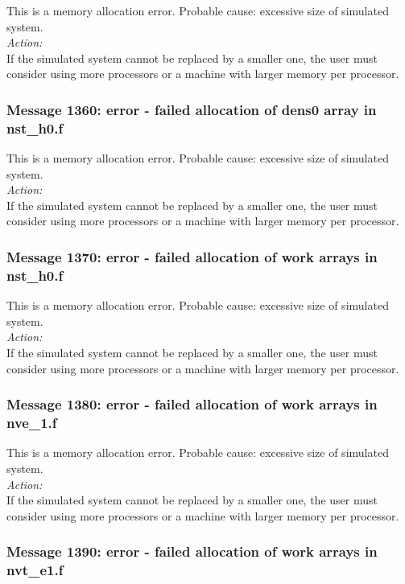 This is a memory allocation error. Probable cause: excessive size of
simulated system. \\

\noindent
{\em Action:}\\
If the simulated system cannot be replaced by a smaller one, the user
must consider using more processors or a machine with larger memory
per processor.

\subsubsection*{Message 1360: error - failed allocation of dens0 array
in nst\_h0.f}

This is a memory allocation error. Probable cause: excessive size of
simulated system. \\

\noindent
{\em Action:}\\
If the simulated system cannot be replaced by a smaller one, the user
must consider using more processors or a machine with larger memory
per processor.

\subsubsection*{Message 1370: error - failed allocation of work arrays
in nst\_h0.f}

This is a memory allocation error. Probable cause: excessive size of
simulated system. \\

\noindent
{\em Action:}\\
If the simulated system cannot be replaced by a smaller one, the user
must consider using more processors or a machine with larger memory
per processor.

\subsubsection*{Message 1380: error - failed allocation of work arrays
in nve\_1.f}

This is a memory allocation error. Probable cause: excessive size of
simulated system. \\

\noindent
{\em Action:}\\
If the simulated system cannot be replaced by a smaller one, the user
must consider using more processors or a machine with larger memory
per processor.

\subsubsection*{Message 1390: error - failed allocation of work arrays
in nvt\_e1.f}

